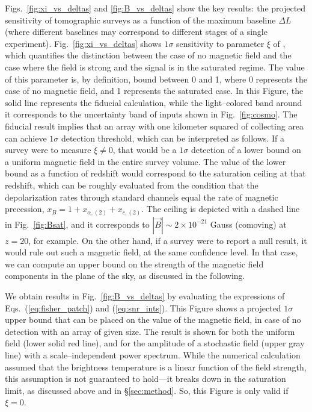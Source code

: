 Figs.~\ref{fig:xi_vs_deltas} and \ref{fig:B_vs_deltas} show the key results: the projected sensitivity of tomographic surveys as a function of the maximum baseline $\Delta L$ (where different baselines may correspond to different stages of a single experiment). Fig.~\ref{fig:xi_vs_deltas} shows $1\sigma$ sensitivity to parameter $\xi$ of \eq{\ref{eq:saturated_P}}, which quantifies the distinction between the case of no magnetic field and the case where the field is strong and the signal is in the saturated regime. The value of this parameter is, by definition, bound between 0 and 1, where 0 represents the case of no magnetic field, and 1 represents the saturated case. In this Figure, the solid line represents the fiducial calculation, while the light--colored band around it corresponds to the uncertainty band of inputs shown in Fig.~\ref{fig:cosmo}. The fiducial result implies that an array with one kilometer squared of collecting area can achieve $1\sigma$ detection threshold, which can be interpreted as follows. If a survey were to measure $\xi\ne 0$, that would be a $1\sigma$ detection of a lower bound on a uniform magnetic field in the entire survey volume. The value of the lower bound as a function of redshift would correspond to the saturation ceiling at that redshift, which can be roughly evaluated from the condition that the depolarization rates through standard channels equal the rate of magnetic precession, $x_B = 1+x_{\alpha ,(2)} +x_{c,(2)}$. The ceiling is depicted with a dashed line in Fig.~\ref{fig:Bsat}, and it corresponds to $|\vec B|\sim 2\times 10^{-21}$ Gauss (comoving) at $z=20$, for example.  On the other hand, if a survey were to report a null result, it would rule out such a magnetic field, at the same confidence level. In that case, we can compute an upper bound on the strength of the magnetic field components in the plane of the sky, as discussed in the following. 

We obtain results in Fig.~\ref{fig:B_vs_deltas} by evaluating the expressions of Eqs.~(\ref{eq:fisher_patch}) and (\ref{eq:snr_ints}). This Figure shows a projected $1\sigma$ upper bound that can be placed on the value of the magnetic field, in case of no detection with an array of given size. The result is shown for both the uniform field (lower solid red line), and for the amplitude of a stochastic field (upper gray line) with a scale--independent power spectrum. While the numerical calculation assumed that the brightness temperature is a linear function of the field strength, this assumption is not guaranteed to hold---it breaks down in the saturation limit, as discussed above and in \S\ref{sec:method}. So, this Figure is only valid if $\xi=0$.

